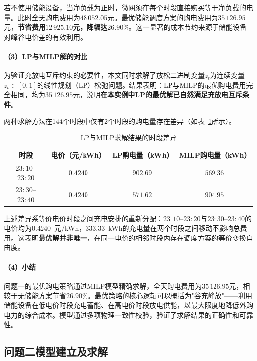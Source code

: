 \documentclass[12pt,a4paper]{ctexart}
\theoremstyle{definition}
\theoremstyle{plain}
\theoremstyle{remark}
\begin{document}
若不使用储能设备，当净负载为正时，微网须在每个时段直接购买等于净负载的电量。此时全天购电费用为$48\,052.05$元。最优储能调度方案的购电费用为$35\,126.95$元，\textbf{节省费用$12\,925.10$元，降幅达$26.90\%$}。这一显著的成本节约来源于储能设备对峰谷电价差的有效利用。

\paragraph{（3）LP与MILP解的对比}

为验证充放电互斥约束的必要性，本文同时求解了放松二进制变量$z_t$为连续变量$z_t \in [0, 1]$的线性规划（LP）松弛问题。结果表明：LP与MILP的最优购电费用完全相同，均为$35\,126.95$元，说明\textbf{在本实例中LP的最优解已自然满足充放电互斥条件}。

两种求解方法在144个时段中仅有2个时段的购电量存在差异（如表~\ref{tab:q1_lp_milp_diff}所示）。

\begin{table}[H]
\centering
\caption{LP与MILP求解结果的时段差异}
\label{tab:q1_lp_milp_diff}
\begin{tabular}{cccc}
\toprule
\textbf{时段} & \textbf{电价（元/kWh）} & \textbf{LP购电量（kWh）} & \textbf{MILP购电量（kWh）} \\
\midrule
$23{:}10$--$23{:}20$ & $0.4240$ & $902.69$ & $569.36$ \\
$23{:}30$--$23{:}40$ & $0.4240$ & $571.62$ & $904.95$ \\
\bottomrule
\end{tabular}
\end{table}

上述差异系等价电价时段之间充电安排的重新分配：$23{:}10$--$23{:}20$与$23{:}30$--$23{:}40$的电价均为$0.4240$~元/kWh，$333.33$~kWh的充电量在两个时段之间移动不影响总费用。这表明\textbf{最优解并非唯一}，在同一电价的相邻时段内存在调度方案的等价变换自由度。

\paragraph{（4）小结}

问题一的最优购电策略通过MILP模型精确求解，全天购电费用为$35\,126.95$元，相较于无储能方案节省$26.90\%$。最优策略的核心逻辑可以概括为"谷充峰放"——利用储能设备在低电价时段充电蓄能、在高电价时段放电供能，以最大限度地降低外购电力的综合成本。模型通过多项物理一致性校验，验证了求解结果的正确性和可靠性。


\subsection{问题二模型建立及求解}
\end{document}

